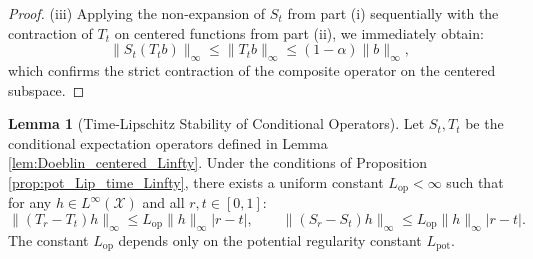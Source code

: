 \documentclass[11pt]{article}
\theoremstyle{definition}
\newtheorem{lemma}[theorem]{Lemma}
\numberwithin{equation}{section}%
\begin{document}
{\begin{proof}
(iii) Applying the non-expansion of $S_t$ from part (i) sequentially with the contraction of $T_t$ on centered functions from part (ii), we immediately obtain:
\[
\|S_t (T_t b)\|_\infty \le \|T_t b\|_\infty \le (1-\alpha)\|b\|_\infty,
\]
which confirms the strict contraction of the composite operator on the centered subspace.
\end{proof}

\begin{lemma}[Time-Lipschitz Stability of Conditional Operators]
\label{lem:operator_stability_Linfty}
Let $S_t, T_t$ be the conditional expectation operators defined in Lemma \ref{lem:Doeblin_centered_Linfty}. Under the conditions of Proposition \ref{prop:pot_Lip_time_Linfty}, there exists a uniform constant $L_{\mathrm{op}} < \infty$ such that for any $h \in L^\infty(\mathcal{X})$ and all $r, t \in [0,1]$:
\[
\|(T_r - T_t)h\|_\infty \le L_{\mathrm{op}} \|h\|_\infty |r - t|, \qquad \|(S_r - S_t)h\|_\infty \le L_{\mathrm{op}} \|h\|_\infty |r - t|.
\]
The constant $L_{\mathrm{op}}$ depends only on the potential regularity constant $L_{\mathrm{pot}}$.
\end{lemma}

}
\end{document}
